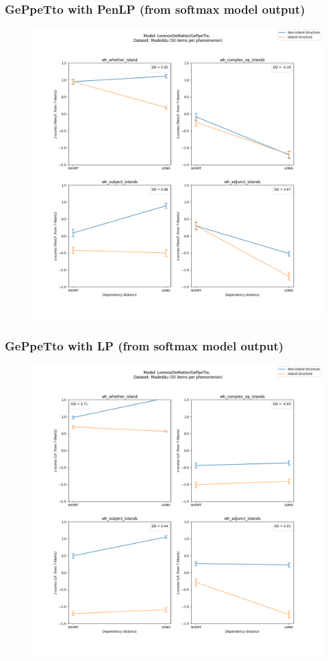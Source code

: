 \subsubsection{GePpeTto with PenLP (from softmax model output)}
\begin{figure}[h]
	\centering
	\includegraphics[width=1\textwidth]{images/AppendixA/Madeddu_wh_LorenzoDeMattei_GePpeTto_PenLP-zscores-likert-2022-07-11.png} 
\end{figure}

\clearpage
\subsubsection{GePpeTto with LP (from softmax model output)}
\begin{figure}[h]
	\centering
	\includegraphics[width=1\textwidth]{images/AppendixA/Madeddu_wh_LorenzoDeMattei_GePpeTto_LP-zscores-likert-2022-07-11.png} 
\end{figure}


